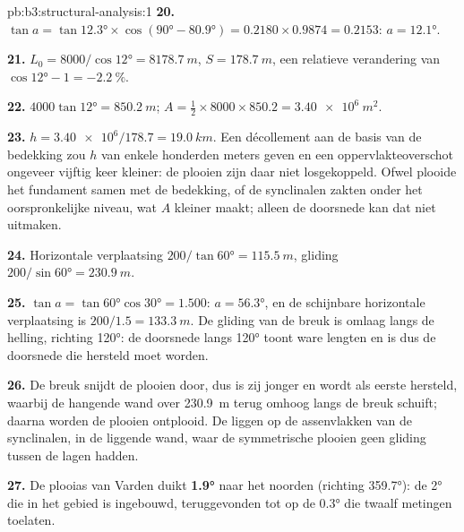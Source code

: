 \begin{solution}{pb:b3:structural-analysis:1}
\textbf{20.} $\tan a = \tan\ang{12.3}\times\cos(\ang{90} - \ang{80.9}) =
0.2180\times0.9874 = 0.2153$: $a = \ang{12.1}$.

\textbf{21.} $L_0 = 8000/\cos\ang{12} = \qty{8178.7}{m}$, $S =
\qty{178.7}{m}$, een relatieve verandering van $\cos\ang{12} - 1 =
\qty{-2.2}{\percent}$.

\textbf{22.} $4000\tan\ang{12} = \qty{850.2}{m}$; $A = \tfrac12\times8000\times
850.2 = \qty{3.40e6}{m^2}$.

\textbf{23.} $h = \num{3.40e6}/178.7 = \qty{19.0}{km}$. Een décollement aan de
basis van de bedekking zou $h$ van enkele honderden meters geven en een oppervlakteoverschot
ongeveer vijftig keer kleiner: de plooien zijn daar niet losgekoppeld. Ofwel plooide het
fundament samen met de bedekking, of de synclinalen zakten onder het oorspronkelijke
niveau, wat $A$ kleiner maakt; alleen de doorsnede kan dat niet uitmaken.

\textbf{24.} Horizontale verplaatsing $200/\tan\ang{60} = \qty{115.5}{m}$, gliding $200/\sin\ang{60}
= \qty{230.9}{m}$.

\textbf{25.} $\tan a = \tan\ang{60}\cos\ang{30} = 1.500$: $a = \ang{56.3}$, en
de schijnbare horizontale verplaatsing is $200/1.5 = \qty{133.3}{m}$. De gliding van de breuk is
omlaag langs de helling, richting \ang{120}: de doorsnede langs \ang{120} toont ware
lengten en is dus de doorsnede die hersteld moet worden.

\textbf{26.} De breuk snijdt de plooien door, dus is zij jonger en wordt als eerste hersteld,
waarbij de hangende wand over \qty{230.9}{m} terug omhoog langs de breuk schuift; daarna worden de plooien
ontplooid. De  liggen op de assenvlakken van de synclinalen, in de
liggende wand, waar de symmetrische plooien geen gliding tussen de lagen hadden.

\textbf{27.} De plooias van Varden duikt
\textbf{\ang[text-series-to-math=true]{1.9}} naar het noorden (richting
\ang{359.7}): de \ang{2} die in het gebied is ingebouwd, teruggevonden tot op de
\ang{0.3} die twaalf metingen toelaten.
\end{solution}
